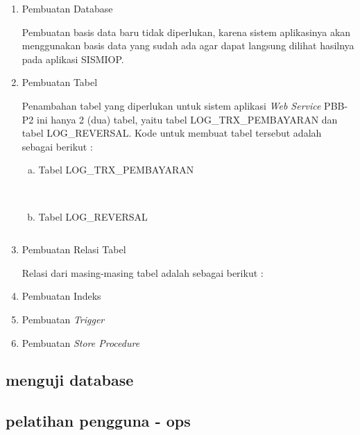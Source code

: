 \documentclass[pdftex,12pt, oneside]{article}
\begin{document}
\begin{enumerate}[1.]
	\item Pembuatan Database
	
	Pembuatan basis data baru tidak diperlukan, karena sistem aplikasinya akan menggunakan basis data yang sudah ada agar dapat langsung dilihat hasilnya pada aplikasi SISMIOP.
	
	\item Pembuatan Tabel
	
	Penambahan tabel yang diperlukan untuk sistem aplikasi \textit{Web Service} PBB-P2 ini hanya 2 (dua) tabel, yaitu tabel LOG\_TRX\_PEMBAYARAN dan tabel LOG\_REVERSAL. Kode untuk membuat tabel tersebut adalah sebagai berikut :
	
	\begin{enumerate}[a.]
		\item Tabel LOG\_TRX\_PEMBAYARAN
		
\begin{lstlisting}
                                                                                                                                            
\end{lstlisting}
		
		\item Tabel LOG\_REVERSAL
		
\begin{lstlisting}
\end{lstlisting}
		
	\end{enumerate}	
		
	\item Pembuatan Relasi Tabel
	
	Relasi dari masing-masing tabel adalah sebagai berikut :
	
	
	
	\item Pembuatan Indeks
	
	
	
	\item Pembuatan \textit{Trigger}
	\item Pembuatan \textit{Store Procedure}
\end{enumerate}

\subsection{menguji database}

\subsection{pelatihan pengguna - ops}
\end{document}
